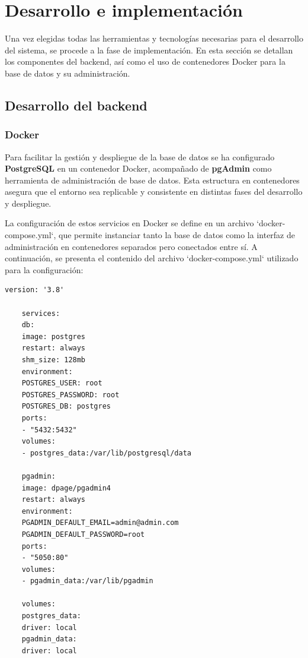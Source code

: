 \chapter{Desarrollo e implementación}

Una vez elegidas todas las herramientas y tecnologías necesarias para el desarrollo del sistema, se procede a la fase de implementación. En esta sección se detallan los componentes del backend, así como el uso de contenedores Docker para la base de datos y su administración.

\section{Desarrollo del backend}

\subsection{Docker}

Para facilitar la gestión y despliegue de la base de datos se ha configurado \textbf{PostgreSQL} en un contenedor Docker, acompañado de \textbf{pgAdmin} como herramienta de administración de base de datos. Esta estructura en contenedores asegura que el entorno sea replicable y consistente en distintas fases del desarrollo y despliegue.

La configuración de estos servicios en Docker se define en un archivo `docker-compose.yml`, que permite instanciar tanto la base de datos como la interfaz de administración en contenedores separados pero conectados entre sí. A continuación, se presenta el contenido del archivo `docker-compose.yml` utilizado para la configuración:


\begin{lstlisting}[caption={Archivo docker-compose.yml para PostgreSQL y pgAdmin}, label={lst:docker-compose}]
	version: '3.8'
	
	services:
	db:
	image: postgres
	restart: always
	shm_size: 128mb
	environment:
	POSTGRES_USER: root
	POSTGRES_PASSWORD: root
	POSTGRES_DB: postgres
	ports:
	- "5432:5432"
	volumes:
	- postgres_data:/var/lib/postgresql/data
	
	pgadmin:
	image: dpage/pgadmin4
	restart: always
	environment:
	PGADMIN_DEFAULT_EMAIL=admin@admin.com
	PGADMIN_DEFAULT_PASSWORD=root
	ports:
	- "5050:80"
	volumes:
	- pgadmin_data:/var/lib/pgadmin
	
	volumes:
	postgres_data: 
	driver: local
	pgadmin_data: 
	driver: local
\end{lstlisting}


